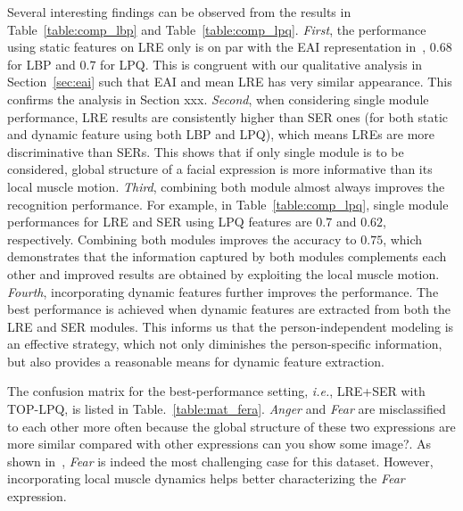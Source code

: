 \documentclass[journal]{IEEEtran}
\begin{document}
Several interesting findings can be observed from the results in Table~\ref{table:comp_lbp} and Table~\ref{table:comp_lpq}. \textit{First}, the performance using static features on LRE only is on par with the EAI representation in~\cite{Yang_SMCB12}, $0.68$ for LBP and $0.7$ for LPQ. This is congruent with our qualitative analysis in Section~\ref{sec:eai} such that EAI and mean LRE has very similar appearance. This confirms the analysis in Section xxx. \textit{Second}, when considering single module performance, LRE results are consistently higher than SER ones (for both static and dynamic feature using both LBP and LPQ), which means LREs are more discriminative than SERs. This shows that if only single module is to be considered, global structure of a facial expression is more informative than its local muscle motion. \textit{Third}, combining both module almost always improves the recognition performance. For example, in Table~\ref{table:comp_lpq}, single module performances for LRE and SER using LPQ features are $0.7$ and $0.62$, respectively. Combining both modules improves the accuracy to $0.75$, which demonstrates that the information captured by both modules complements each other and improved results are obtained by exploiting the local muscle motion. \textit{Fourth}, incorporating dynamic features further improves the performance. The best performance is achieved when dynamic features are extracted from both the LRE and SER modules. This informs us that the person-independent modeling is an effective strategy, which not only diminishes the person-specific information, but also provides a reasonable means for dynamic feature extraction. 

The confusion matrix for the best-performance setting, \textit{i.e.}, LRE+SER with TOP-LPQ, is listed in Table.~\ref{table:mat_fera}. \textit{Anger} and \textit{Fear} are misclassified to each other more often because the global structure of these two expressions are more similar compared with other expressions \textcolor[rgb]{1,0,0}{can you show some image?}. As shown in~\cite{Valstar12}, \textit{Fear} is indeed the most challenging case for this dataset. However, incorporating local muscle dynamics helps better characterizing the \textit{Fear} expression. 
\end{document}
